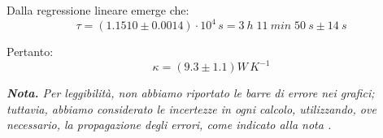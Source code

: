 \documentclass{article}
\begin{document}
Dalla regressione lineare emerge che:
\[\tau = \left(1.1510\pm0.0014\right)\cdot 10^4\,\unit{s} = \qty{3}{h}\;\qty{11}{min}\;\qty{50}{s}\pm\qty{14}{s}\]

Pertanto:
\[\kappa = \left(9.3\pm1.1\right)\unit{W\,K^{-1}}\]

\emph{
    \textbf{Nota.} Per leggibilità,
    \emph{non} abbiamo riportato le barre di errore nei grafici; tuttavia, abbiamo
    considerato le incertezze in ogni calcolo, utilizzando, ove necessario, la propagazione
    degli errori, come indicato alla nota \footnotemark[2].
}
\end{document}
